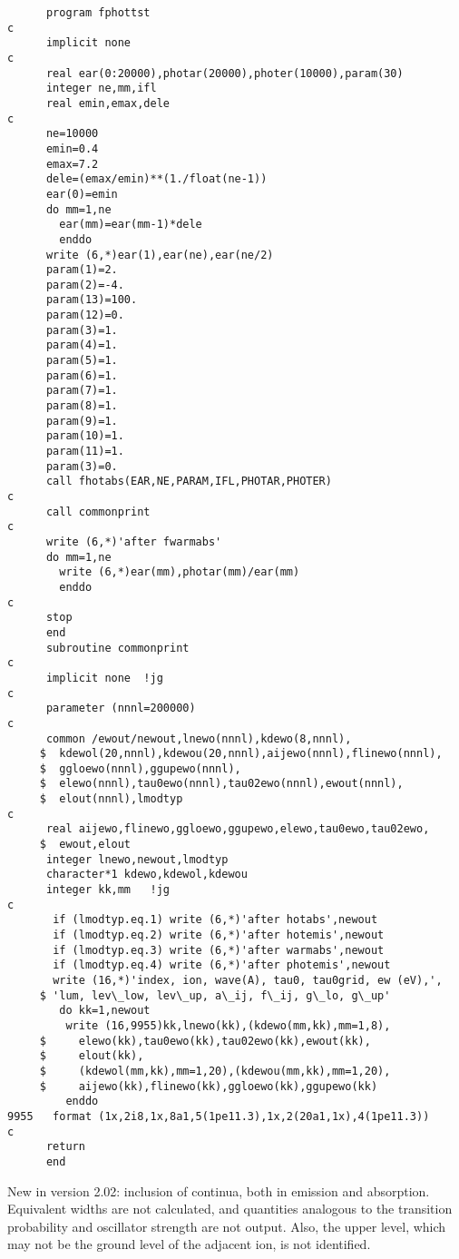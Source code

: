 \begin{verbatim}
      program fphottst
c
      implicit none
c
      real ear(0:20000),photar(20000),photer(10000),param(30)      
      integer ne,mm,ifl
      real emin,emax,dele
c
      ne=10000
      emin=0.4
      emax=7.2
      dele=(emax/emin)**(1./float(ne-1))
      ear(0)=emin
      do mm=1,ne
        ear(mm)=ear(mm-1)*dele
        enddo
      write (6,*)ear(1),ear(ne),ear(ne/2)
      param(1)=2.
      param(2)=-4.
      param(13)=100.
      param(12)=0.
      param(3)=1.
      param(4)=1.
      param(5)=1.
      param(6)=1.
      param(7)=1.
      param(8)=1.
      param(9)=1.
      param(10)=1.
      param(11)=1.
      param(3)=0.
      call fhotabs(EAR,NE,PARAM,IFL,PHOTAR,PHOTER)
c
      call commonprint
c
      write (6,*)'after fwarmabs'
      do mm=1,ne
        write (6,*)ear(mm),photar(mm)/ear(mm)
        enddo
c
      stop
      end
      subroutine commonprint
c
      implicit none  !jg
c
      parameter (nnnl=200000)
c
      common /ewout/newout,lnewo(nnnl),kdewo(8,nnnl),
     $  kdewol(20,nnnl),kdewou(20,nnnl),aijewo(nnnl),flinewo(nnnl),
     $  ggloewo(nnnl),ggupewo(nnnl),
     $  elewo(nnnl),tau0ewo(nnnl),tau02ewo(nnnl),ewout(nnnl),
     $  elout(nnnl),lmodtyp
c
      real aijewo,flinewo,ggloewo,ggupewo,elewo,tau0ewo,tau02ewo,
     $  ewout,elout
      integer lnewo,newout,lmodtyp
      character*1 kdewo,kdewol,kdewou
      integer kk,mm   !jg
c
       if (lmodtyp.eq.1) write (6,*)'after hotabs',newout
       if (lmodtyp.eq.2) write (6,*)'after hotemis',newout
       if (lmodtyp.eq.3) write (6,*)'after warmabs',newout
       if (lmodtyp.eq.4) write (6,*)'after photemis',newout
       write (16,*)'index, ion, wave(A), tau0, tau0grid, ew (eV),',
     $ 'lum, lev\_low, lev\_up, a\_ij, f\_ij, g\_lo, g\_up'
        do kk=1,newout
         write (16,9955)kk,lnewo(kk),(kdewo(mm,kk),mm=1,8),
     $     elewo(kk),tau0ewo(kk),tau02ewo(kk),ewout(kk),
     $     elout(kk),
     $     (kdewol(mm,kk),mm=1,20),(kdewou(mm,kk),mm=1,20),
     $     aijewo(kk),flinewo(kk),ggloewo(kk),ggupewo(kk)
         enddo
9955   format (1x,2i8,1x,8a1,5(1pe11.3),1x,2(20a1,1x),4(1pe11.3))
c
      return
      end
\end{verbatim}


New in version 2.02:  inclusion of continua, both in emission and absorption.  
Equivalent widths are not calculated, and quantities analogous to the 
transition probability and oscillator strength are not output.  Also, the 
upper level, which may not be the ground level of the adjacent ion, is 
not identified.  

